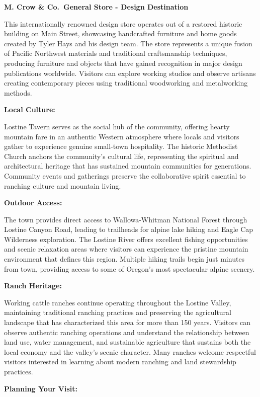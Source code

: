 \documentclass[
  11pt,
  letterpaper,
  DIV=10,
  numbers=noendperiod]{scrartcl}
\begin{document}
\textbf{M. Crow \& Co.~General Store - Design Destination}

This internationally renowned design store operates out of a restored
historic building on Main Street, showcasing handcrafted furniture and
home goods created by Tyler Hays and his design team. The store
represents a unique fusion of Pacific Northwest materials and
traditional craftsmanship techniques, producing furniture and objects
that have gained recognition in major design publications worldwide.
Visitors can explore working studios and observe artisans creating
contemporary pieces using traditional woodworking and metalworking
methods.

\textbf{Local Culture:}

Lostine Tavern serves as the social hub of the community, offering
hearty mountain fare in an authentic Western atmosphere where locals and
visitors gather to experience genuine small-town hospitality. The
historic Methodist Church anchors the community's cultural life,
representing the spiritual and architectural heritage that has sustained
mountain communities for generations. Community events and gatherings
preserve the collaborative spirit essential to ranching culture and
mountain living.

\textbf{Outdoor Access:}

The town provides direct access to Wallowa-Whitman National Forest
through Lostine Canyon Road, leading to trailheads for alpine lake
hiking and Eagle Cap Wilderness exploration. The Lostine River offers
excellent fishing opportunities and scenic relaxation areas where
visitors can experience the pristine mountain environment that defines
this region. Multiple hiking trails begin just minutes from town,
providing access to some of Oregon's most spectacular alpine scenery.

\textbf{Ranch Heritage:}

Working cattle ranches continue operating throughout the Lostine Valley,
maintaining traditional ranching practices and preserving the
agricultural landscape that has characterized this area for more than
150 years. Visitors can observe authentic ranching operations and
understand the relationship between land use, water management, and
sustainable agriculture that sustains both the local economy and the
valley's scenic character. Many ranches welcome respectful visitors
interested in learning about modern ranching and land stewardship
practices.

\textbf{Planning Your Visit:}
\end{document}

